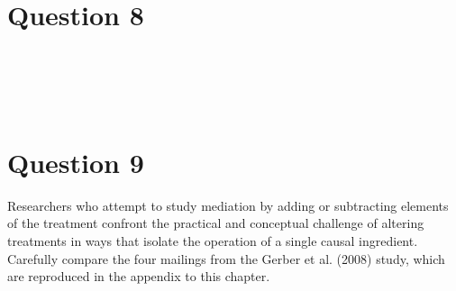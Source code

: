 \documentclass[11pt,notitlepage]{article}\usepackage[]{graphicx}\usepackage[]{color}
\makeatletter
\newenvironment{kframe}{%
 \def\at@end@of@kframe{}%
 \ifinner\ifhmode%
  \def\at@end@of@kframe{\end{minipage}}%
  \begin{minipage}{\columnwidth}%
 \fi\fi%
 \def\FrameCommand##1{\hskip\@totalleftmargin \hskip-\fboxsep
 \colorbox{shadecolor}{##1}\hskip-\fboxsep
     \hskip-\linewidth \hskip-\@totalleftmargin \hskip\columnwidth}%
 \MakeFramed {\advance\hsize-\width
   \@totalleftmargin\z@ \linewidth\hsize
   \@setminipage}}%
 {\par\unskip\endMakeFramed%
 \at@end@of@kframe}
\newenvironment{knitrout}{}{} %
\makeatother
\begin{document}
\section*{Question 8}
\begin{knitrout}
\color{fgcolor}\begin{kframe}
\begin{verbatim}





\end{verbatim}
\end{kframe}
\end{knitrout}

\section*{Question 9}
Researchers who attempt to study mediation by adding or subtracting elements of the treatment confront the practical and conceptual challenge of altering treatments in ways that isolate the operation of a single causal ingredient. Carefully compare the four mailings from the Gerber et al. (2008) study, which are reproduced in the appendix to this chapter.
\end{document}
